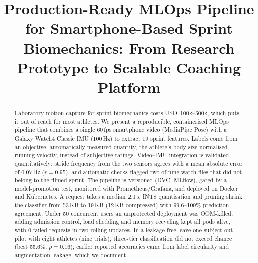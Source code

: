 \documentclass[conference]{IEEEtran}
\begin{document}
\title{Production-Ready MLOps Pipeline for Smartphone-Based Sprint Biomechanics: From Research Prototype to Scalable Coaching Platform}

\author{
\and
{}
\and
{}
\and
{}
\and
{}
}

\maketitle

\begin{abstract}
Laboratory motion capture for sprint biomechanics costs USD~100k--500k, which puts it out of reach for most athletes. We present a reproducible, containerised MLOps pipeline that combines a single 60\,fps smartphone video (MediaPipe Pose) with a Galaxy Watch4 Classic IMU (100\,Hz) to extract 19 sprint features. Labels come from an objective, automatically measured quantity, the athlete's body-size-normalised running velocity, instead of subjective ratings. Video--IMU integration is validated quantitatively: stride frequency from the two sensors agrees with a mean absolute error of 0.07\,Hz ($r=0.95$), and automatic checks flagged two of nine watch files that did not belong to the filmed sprint. The pipeline is versioned (DVC, MLflow), gated by a model-promotion test, monitored with Prometheus/Grafana, and deployed on Docker and Kubernetes. A request takes a median 2.1\,s; INT8 quantisation and pruning shrink the classifier from 53\,KB to 19\,KB (12\,KB compressed) with 99.6--100\% prediction agreement. Under 50 concurrent users an unprotected deployment was OOM-killed; adding admission control, load shedding and memory recycling kept all pods alive, with 0 failed requests in two rolling updates. In a leakage-free leave-one-subject-out pilot with eight athletes (nine trials), three-tier classification did not exceed chance (best 55.6\%, $p=0.16$); earlier reported accuracies came from label circularity and augmentation leakage, which we document.
\end{abstract}
\end{document}
